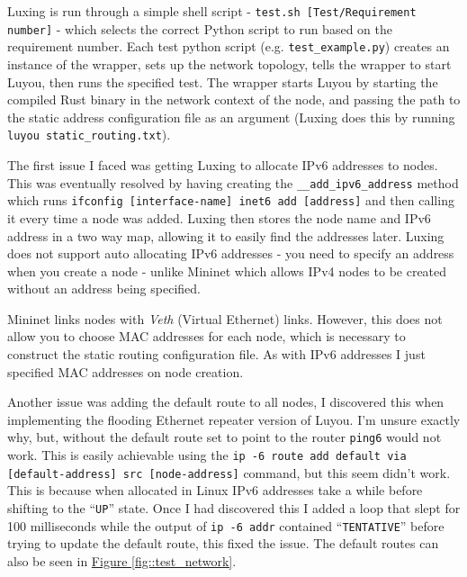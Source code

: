 \documentclass[12pt,a4paper,twoside,openright]{report}
\begin{document}
\bigskip

Luxing is run through a simple shell script - \verb!test.sh [Test/Requirement number]! - which selects the correct Python script to run based on the requirement number. Each test python script (e.g. \verb!test_example.py!) creates an instance of the wrapper, sets up the network topology, tells the wrapper to start Luyou, then runs the specified test. The wrapper starts Luyou by starting the compiled Rust binary in the network context of the node, and passing the path to the static address configuration file as an argument (Luxing does this by running \verb!luyou static_routing.txt!).

\bigskip

The first issue I faced was getting Luxing to allocate IPv6 addresses to nodes. This was eventually resolved by having creating the \verb!__add_ipv6_address! method which runs \verb!ifconfig [interface-name] inet6 add [address]! and then calling it every time a node was added. Luxing then stores the node name and IPv6 address in a two way map, allowing it to easily find the addresses later. Luxing does not support auto allocating IPv6 addresses - you need to specify an address when you create a node - unlike Mininet which allows IPv4 nodes to be created without an address being specified.

\bigskip

Mininet links nodes with \textit{Veth} (Virtual Ethernet) links. However, this does not allow you to choose MAC addresses for each node, which is necessary to construct the static routing configuration file. As with IPv6 addresses I just specified MAC addresses on node creation.

\bigskip

Another issue was adding the default route to all nodes, I discovered this when implementing the flooding Ethernet repeater version of Luyou.  I'm unsure exactly why, but, without the default route set to point to the router \verb!ping6! would not work. This is easily achievable using the \verb!ip -6 route add default via [default-address] src [node-address]! command, but this seem didn't work.  This is because when allocated in Linux IPv6 addresses take a while before shifting to the ``\verb!UP!'' state.  Once I had discovered this I added a loop that slept for 100 milliseconds while the output of \verb!ip -6 addr! contained ``\verb!TENTATIVE!'' before trying to update the default route, this fixed the issue.  The default routes can also be seen in \hyperref[fig::test_network]{Figure }\ref{fig::test_network}.
\end{document}
